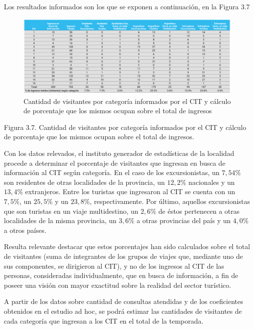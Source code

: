 \documentclass[
]{book}
\begin{document}
Los resultados informados son los que se exponen a continuación, en la Figura 3.7

\begin{figure}

{\centering \includegraphics[width=0.8\linewidth]{imagenes/figura09} 

}

\caption{Cantidad de visitantes por categoría informados por el CIT y cálculo de porcentaje que los mismos ocupan sobre el total de ingresos}\label{fig:cantidaddevisitantes}
\end{figure}

Figura 3.7. Cantidad de visitantes por categoría informados por el CIT y cálculo de porcentaje que los mismos ocupan sobre el total de ingresos.

Con los datos relevados, el instituto generador de estadísticas de la localidad procede a determinar el porcentaje de visitantes que ingresan en busca de información al CIT según categoría. En el caso de los excursionistas, un \(7,54\%\) son residentes de otras localidades de la provincia, un \(12,2\%\) nacionales y un \(13,4\%\) extranjeros. Entre los turistas que ingresaron al CIT se cuenta con un \(7,5\%\), un \(25,5\%\) y un \(23,8\%\), respectivamente. Por último, aquellos excursionistas que son turistas en un viaje multidestino, un \(2,6\%\) de éstos pertenecen a otras localidades de la misma provincia, un \(3,6\%\) a otras provincias del país y un \(4,0\%\) a otros países.

Resulta relevante destacar que estos porcentajes han sido calculados sobre el total de visitantes (suma de integrantes de los grupos de viajes que, mediante uno de sus componentes, se dirigieron al CIT), y no de los ingresos al CIT de las personas, consideradas individualmente, que en busca de información, a fin de poseer una visión con mayor exactitud sobre la realidad del sector turístico.

A partir de los datos sobre cantidad de consultas atendidas y de los coeficientes obtenidos en el estudio ad hoc, se podrá estimar las cantidades de visitantes de cada categoría que ingresan a los CIT en el total de la temporada.
\end{document}
